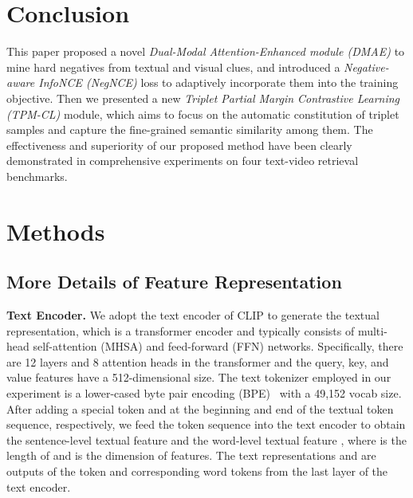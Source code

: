 \documentclass[sigconf]{acmart}
\begin{document}
\section{Conclusion}
This paper proposed a novel \textit{Dual-Modal Attention-Enhanced module (DMAE)} to mine hard negatives from textual and visual clues, and introduced a \textit{Negative-aware InfoNCE (NegNCE)} loss to adaptively incorporate them into the training objective.
Then we presented a new \textit{Triplet Partial Margin Contrastive Learning (TPM-CL)} module, which aims to focus on the automatic constitution of triplet samples and capture the fine-grained semantic similarity among them.
The effectiveness and superiority of our proposed method have been clearly demonstrated in comprehensive experiments on four text-video retrieval benchmarks.














\balance


\appendix


























\section{Methods}
\subsection{More Details of Feature Representation}
\textbf{Text Encoder.} We adopt the text encoder of CLIP to generate the textual representation, which is a transformer encoder and typically consists of multi-head self-attention (MHSA) and feed-forward (FFN) networks.
Specifically, there are 12 layers and 8 attention heads in the transformer and the query, key, and value features have a 512-dimensional size. The text tokenizer employed in our experiment is a lower-cased byte pair encoding (BPE)~\cite{Sennrich2015NeuralMT} with a 49,152 vocab size. 
After adding a special token  and  at the beginning and end of the textual token sequence, respectively, we feed the token sequence into the text encoder to obtain the sentence-level textual feature  and the word-level textual feature , where  is the length of  and  is the dimension of features. 
The text representations  and  are outputs of the  token and corresponding word tokens from the last layer of the text encoder.  
\end{document}
